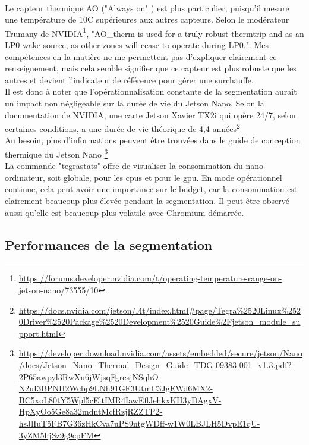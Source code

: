 \vspace{\baselineskip}
\\
\noindent Le capteur thermique AO ("Always on" ) est plus particulier, puisqu'il mesure une température de 10C supérieures aux autres capteurs. Selon le modérateur Trumany de NVIDIA\footnote{\url{https://forums.developer.nvidia.com/t/operating-temperature-range-on-jetson-nano/73555/10}}, "AO\_therm is used for a truly robust thermtrip and as an LP0 wake source, as other zones will cease to operate during LP0.". Mes compétences en la matière ne me permettent pas d'expliquer clairement ce renseignement, mais cela semble signifier que ce capteur est plus robuste que les autres et devient l'indicateur de référence pour gérer une surchauffe. 
\vspace{\baselineskip}
\\
\noindent Il est donc à noter que l'opérationnalisation constante de la segmentation aurait un impact non négligeable sur la durée de vie du Jetson Nano. Selon la documentation de NVIDIA, une carte Jetson Xavier TX2i qui opère 24/7, selon certaines conditions, a une durée de vie théorique de 4,4 années\footnote{\url{https://docs.nvidia.com/jetson/l4t/index.html#page/Tegra\%2520Linux\%2520Driver\%2520Package\%2520Development\%2520Guide\%2Fjetson_module_support.html}}
\vspace{\baselineskip}
\\
\noindent Au besoin, plus d'informations peuvent être trouvées dans le guide de conception thermique du Jetson Nano \footnote{\url{https://developer.download.nvidia.com/assets/embedded/secure/jetson/Nano/docs/Jetson_Nano_Thermal_Design_Guide_TDG-09383-001_v1.3.pdf?2P65awpyl3RwXu6jWjsqFgresjNSqhO-N2uI3BPNH2Wcbp9LNh91GF3UtmC3JgEWd6MX2-BC5xoL80tY5Wpl5cEltIMR4IawEflJehkxKH3yDAgxV-HpXyOo5Ge8a32mdntMcfRzjRZZTP2-hsJlIuT5FB7G36zHkCva7uPS9ntgWDff-w1W0LBJLH5DvpE1qU-3yZM5hjSz9g9cpFM}}
\vspace{\baselineskip}
\\
\noindent La commande "tegrastats" offre de visualiser la consommation du nano-ordinateur, soit globale, pour les \acrshort{cpu}s et pour le \acrshort{gpu}. En mode opérationnel continue, cela peut avoir une importance sur le budget, car la consommation est clairement beaucoup plus élevée pendant la segmentation. Il peut être observé aussi qu'elle est beaucoup plus volatile avec Chromium démarrée. 
\subsection{Performances de la segmentation}
